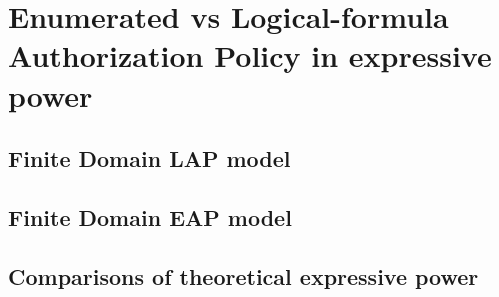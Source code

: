 \chapter{Enumerated vs Logical-formula Authorization Policy in expressive power}
\section{Finite Domain LAP model}
\section{Finite Domain EAP model}
\section{Comparisons of theoretical expressive power}
